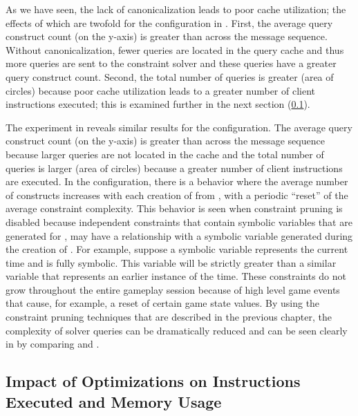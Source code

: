 As we have seen, the lack of canonicalization leads to poor cache
utilization; the effects of which are twofold for the \nocanon
configuration in . First, the average
query construct count (on the y-axis) is greater than \allopt across
the message sequence. Without canonicalization, fewer
queries are located in the query cache and thus more queries are sent
to the constraint solver and these queries have a greater
query construct count. Second, the total number of
queries is greater (area of circles) because poor cache utilization
leads to a greater number of client instructions executed; this is
examined further in the next section (\ref{sec:par:optinst}).

The \xpilot experiment in  reveals
similar results for the \nocanon configuration. The average query
construct count (on the y-axis) is greater than \allopt across the
message sequence because larger queries are not located in the cache
and the total number of queries is larger (area of circles) because a
greater number of client instructions are executed. In the \noprune
configuration, there is a behavior where the average number of
constructs increases with each creation of \execPrefix{\msgNmbr} from
, with a periodic ``reset'' of the average
constraint complexity. This behavior is seen when constraint pruning
is disabled because independent constraints that contain symbolic
variables that are generated for \execPrefix{\msgNmbr}, may have a
relationship with a symbolic variable generated during the creation of
. For example, suppose a symbolic variable
represents the current time and is fully symbolic. This variable will
be strictly greater than a similar variable that represents an
earlier instance of the time. These constraints do not grow throughout
the entire gameplay session because of high level game events that
cause, for example, a reset of certain game state values. By using the
constraint pruning techniques that are described in the previous
chapter, the complexity of solver queries can be dramatically reduced
and can be seen clearly in  by comparing
\allopt and \noprune.

\subsection{Impact of Optimizations on Instructions Executed and Memory Usage}
\label{sec:par:optinst}

